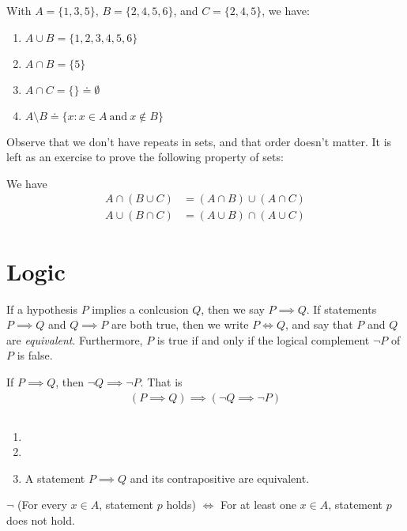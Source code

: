 \begin{example}
	With $A = \{1,3,5\}$, $B  = \{2,4,5,6\}$,
	and $C = \{2,4,5\}$, we have:
	\begin{enumerate}
		\item $A \cup B = \{1,2,3,4,5,6\}$
		\item	$A \cap B = \{5\}$
		\item	$A \cap C  = \{\} \doteq \emptyset$
		\item $A \setminus B  \doteq
			\{ x: x \in A \ \text{and} \ x \not \in B\} $
	\end{enumerate}
\end{example}
Observe that we don't have repeats in sets, and that order doesn't matter.
It is left as an exercise to prove the following property of sets:
\begin{lemma}
We have
	\begin{equation*}
		\begin{split}
			A \cap (B \cup C) &= (A \cap B)  \cup (A \cap C) \\
			A \cup (B \cap C) &= (A \cup B)  \cap (A \cup C)
		\end{split}
	\end{equation*}
\end{lemma}
\section{Logic}
\begin{definition}
	If a hypothesis $P$ implies a conlcusion $Q$, then we say $P \implies Q$.
	If statements $P \implies Q$ and $Q \implies P$ are both true, then we
	write $P \iff Q$, and say that $P$ and $Q$ are \emph{equivalent}.
	Furthermore, $P$ is true if and only if the logical complement $\neg P$ of $P$ is
	false.
\end{definition}
\begin{lemma}[Contrapositive]\label{lem:contrapositive}
	If $P \implies Q $, then $\neg Q \implies \neg P$. That is
	\begin{equation*}
		\begin{split}
			( P \implies Q )  \implies \left( \neg Q  \implies \neg P\right)
		\end{split}
	\end{equation*}
\end{lemma}
\begin{example} $ $
	\begin{enumerate}
		\item {}
		\item {}
	\item A statement $P \implies Q$ and its contrapositive are equivalent.\end{enumerate}
\end{example}
\begin{corollary}
	$\neg$ (For every $x \in A$, statement $p$ holds)
	$\iff$ For at least one $x \in A$, statement $p$ does not hold.
\end{corollary}
